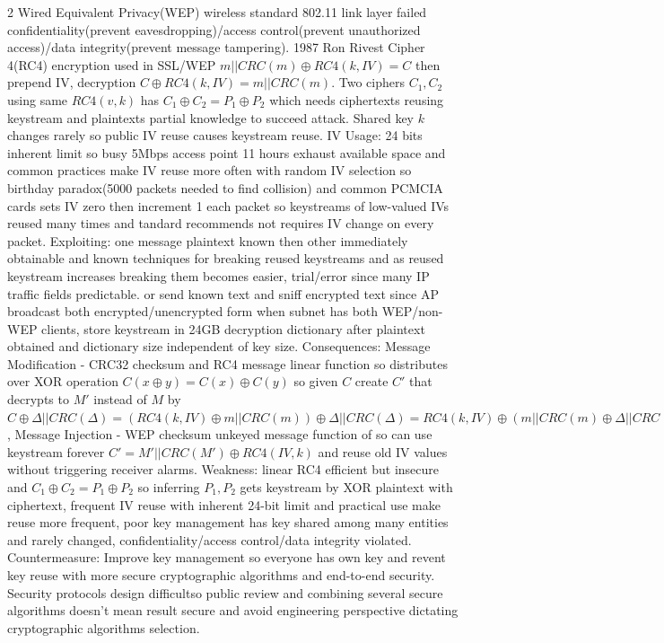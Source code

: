 \documentclass[9pt]{extarticle}
\begin{document}
\begin{multicols}{2}
Wired Equivalent Privacy(WEP) wireless standard 802.11 link layer failed confidentiality(prevent eavesdropping)/access control(prevent unauthorized access)/data integrity(prevent message tampering). 1987 Ron Rivest Cipher 4(RC4) encryption used in SSL/WEP $m||CRC(m)\oplus{RC4(k,IV)}=C$ then prepend IV, decryption $C\oplus{RC4(k,IV)}=m||CRC(m)$. Two ciphers $C_1,C_2$ using same $RC4(v,k)$ has $C_1\oplus{C_2}=P_1\oplus{P_2}$ which needs ciphertexts reusing keystream and plaintexts partial knowledge to succeed attack. Shared key $k$ changes rarely so public IV reuse causes keystream reuse. IV Usage: 24 bits inherent limit so busy 5Mbps access point 11 hours exhaust available space and common practices make IV reuse more often with random IV selection so birthday paradox(5000 packets needed to find collision) and common PCMCIA cards sets IV zero then increment 1 each packet so keystreams of low-valued IVs reused many times and tandard recommends not requires IV change on every packet. Exploiting: one message plaintext known then other immediately obtainable and known techniques for breaking reused keystreams and as reused keystream increases breaking them becomes easier, trial/error since many IP traffic fields predictable. or send known text and sniff encrypted text since AP broadcast both encrypted/unencrypted form when subnet has both WEP/non-WEP clients, store keystream in 24GB decryption dictionary after plaintext obtained and dictionary size independent of key size. Consequences: Message Modification - CRC32 checksum and RC4 message linear function so distributes over XOR operation $C(x\oplus{y})=C(x)\oplus{C(y)}$ so given $C$ create $C'$ that decrypts to $M'$ instead of $M$ by $C\oplus{\Delta||CRC(\Delta)}=(RC4(k,IV)\oplus{m||CRC(m)})\oplus{\Delta||CRC(\Delta)} = RC4(k,IV)\oplus({m||CRC(m)}\oplus{\Delta||CRC(\Delta)})= RC4(k,IV)\oplus{M'||CRC(M')}$, Message Injection - WEP checksum unkeyed message function of so can use keystream forever $C'=M'||CRC(M')\oplus{RC4(IV,k)}$ and reuse old IV values without triggering receiver alarms. Weakness: linear RC4 efficient but insecure and $C_1\oplus{C_2}=P_1\oplus{P_2}$ so inferring $P_1,P_2$ gets keystream by XOR plaintext with ciphertext, frequent IV reuse with inherent 24-bit limit and practical use make reuse more frequent, poor key management has key shared among many entities and rarely changed, confidentiality/access control/data integrity violated. Countermeasure: Improve key management so everyone has own key and revent key reuse with more secure cryptographic algorithms and end-to-end security. Security protocols design difficultso public review and combining several secure algorithms doesn't mean result secure and avoid engineering perspective dictating cryptographic algorithms selection.


\end{multicols}
\end{document}
